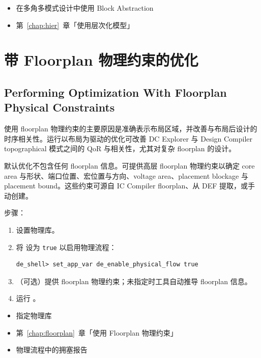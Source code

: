 \begin{seeAlsoBox}
\begin{itemize}
  \item 在多角多模式设计中使用 Block Abstraction
  \item 第~\ref{chap:hier}~章「使用层次化模型」
\end{itemize}
\end{seeAlsoBox}

\section{带 Floorplan 物理约束的优化}
\subsection*{Performing Optimization With Floorplan Physical Constraints}

使用 floorplan 物理约束的主要原因是准确表示布局区域，并改善与布局后设计的时序相关性。运行以布局为驱动的优化可改善 DC Explorer 与 Design Compiler topographical 模式之间的 QoR 与相关性，尤其对复杂 floorplan 的设计。

默认优化不包含任何 floorplan 信息。可提供高层 floorplan 物理约束以确定 core area 与形状、端口位置、宏位置与方向、voltage area、placement blockage 与 placement bound。这些约束可源自 IC Compiler floorplan、从 DEF 提取，或手动创建。

步骤：
\begin{enumerate}
  \item 设置物理库。
  \item 将  设为 \texttt{true} 以启用物理流程：
\begin{lstlisting}
de_shell> set_app_var de_enable_physical_flow true
\end{lstlisting}
  \item （可选）提供 floorplan 物理约束；未指定时工具自动推导 floorplan 信息。
  \item 运行 。
\end{enumerate}

\begin{seeAlsoBox}
\begin{itemize}
  \item 指定物理库
  \item 第~\ref{chap:floorplan}~章「使用 Floorplan 物理约束」
  \item 物理流程中的拥塞报告
\end{itemize}
\end{seeAlsoBox}

